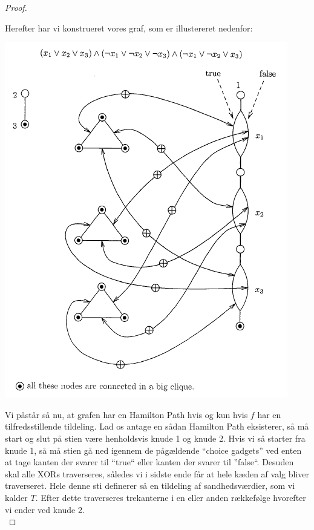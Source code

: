 \begin{proof}
\begin{enumerate}
\end{enumerate}
Herefter har vi konstrueret vores graf, som er illustereret nedenfor:

\begin{center}
 \includegraphics[bb=0 0 350 440]{./hamiltonPath.png}
\end{center}

Vi påstår så nu, at grafen har en Hamilton Path hvis og kun hvis $f$ har en
tilfredsstillende tildeling. Lad os antage en sådan Hamilton Path eksisterer,
så må start og slut på stien være henholdsvis knude 1 og knude 2. Hvis vi så
starter fra knude 1, så må stien gå ned igennem de pågældende ``choice
gadgets'' ved enten at tage kanten der svarer til ``true`` eller kanten der
svarer til ''false``. Desuden skal alle XORs traverseres, således vi i sidste
ende får at hele kæden af valg bliver traverseret. Hele denne sti definerer så
en tildeling af sandhedsværdier, som vi kalder $T$. Efter dette traverseres
trekanterne i en eller anden rækkefølge hvorefter vi ender ved knude 2.\\


\end{proof}
